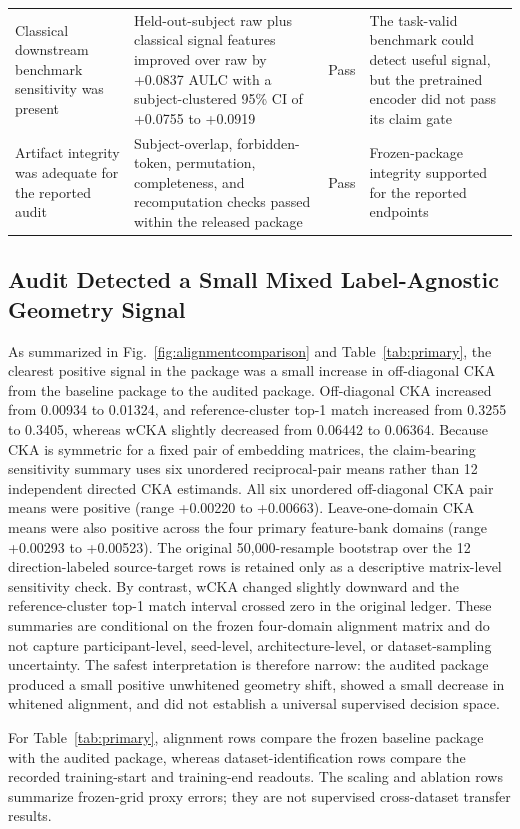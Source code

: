 \documentclass[journal]{IEEEtran}
\begin{document}
\begin{table}[t]
\begin{tabularx}{\textwidth}{@{}p{3.25cm}p{4.8cm}p{2.0cm}Y@{}}
Classical downstream benchmark sensitivity was present & Held-out-subject raw plus classical signal features improved over raw by +0.0837 AULC with a subject-clustered 95\% CI of +0.0755 to +0.0919 & Pass & The task-valid benchmark could detect useful signal, but the pretrained encoder did not pass its claim gate \\
Artifact integrity was adequate for the reported audit & Subject-overlap, forbidden-token, permutation, completeness, and recomputation checks passed within the released package & Pass & Frozen-package integrity supported for the reported endpoints \\
\bottomrule
\end{tabularx}
\end{table}

\subsection{Audit Detected a Small Mixed Label-Agnostic Geometry Signal}
As summarized in Fig.~\ref{fig:alignmentcomparison} and Table~\ref{tab:primary}, the clearest positive signal in the package was a small increase in off-diagonal CKA from the baseline package to the audited package. Off-diagonal CKA increased from 0.00934 to 0.01324, and reference-cluster top-1 match increased from 0.3255 to 0.3405, whereas wCKA slightly decreased from 0.06442 to 0.06364. Because CKA is symmetric for a fixed pair of embedding matrices, the claim-bearing sensitivity summary uses six unordered reciprocal-pair means rather than 12 independent directed CKA estimands. All six unordered off-diagonal CKA pair means were positive (range +0.00220 to +0.00663). Leave-one-domain CKA means were also positive across the four primary feature-bank domains (range +0.00293 to +0.00523). The original 50{,}000-resample bootstrap over the 12 direction-labeled source-target rows is retained only as a descriptive matrix-level sensitivity check. By contrast, wCKA changed slightly downward and the reference-cluster top-1 match interval crossed zero in the original ledger. These summaries are conditional on the frozen four-domain alignment matrix and do not capture participant-level, seed-level, architecture-level, or dataset-sampling uncertainty. The safest interpretation is therefore narrow: the audited package produced a small positive unwhitened geometry shift, showed a small decrease in whitened alignment, and did not establish a universal supervised decision space.

For Table~\ref{tab:primary}, alignment rows compare the frozen baseline package with the audited package, whereas dataset-identification rows compare the recorded training-start and training-end readouts. The scaling and ablation rows summarize frozen-grid proxy errors; they are not supervised cross-dataset transfer results.
\end{document}
